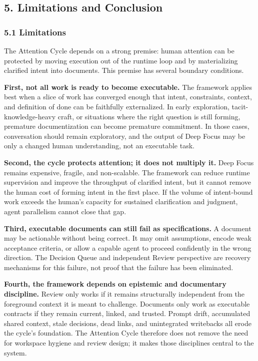 \documentclass[
  nonatbib,
  preprint]{article}
\begin{document}
\subsection{5. Limitations and
Conclusion}\label{limitations-and-conclusion}

\subsubsection{\texorpdfstring{\textbf{5.1
Limitations}}{5.1 Limitations}}\label{limitations}

The Attention Cycle depends on a strong premise: human attention can be
protected by moving execution out of the runtime loop and by
materializing clarified intent into documents. This premise has several
boundary conditions.

\textbf{First, not all work is ready to become executable.} The
framework applies best when a slice of work has converged enough that
intent, constraints, context, and definition of done can be faithfully
externalized. In early exploration, tacit-knowledge-heavy craft, or
situations where the right question is still forming, premature
documentization can become premature commitment. In those cases,
conversation should remain exploratory, and the output of Deep Focus may
be only a changed human understanding, not an executable task.

\textbf{Second, the cycle protects attention; it does not multiply it.}
Deep Focus remains expensive, fragile, and non-scalable. The framework
can reduce runtime supervision and improve the throughput of clarified
intent, but it cannot remove the human cost of forming intent in the
first place. If the volume of intent-bound work exceeds the human's
capacity for sustained clarification and judgment, agent parallelism
cannot close that gap.

\textbf{Third, executable documents can still fail as specifications.} A
document may be actionable without being correct. It may omit
assumptions, encode weak acceptance criteria, or allow a capable agent
to proceed confidently in the wrong direction. The Decision Queue and
independent Review perspective are recovery mechanisms for this failure,
not proof that the failure has been eliminated.

\textbf{Fourth, the framework depends on epistemic and documentary
discipline.} Review only works if it remains structurally independent
from the foreground context it is meant to challenge. Documents only
work as executable contracts if they remain current, linked, and
trusted. Prompt drift, accumulated shared context, stale decisions, dead
links, and unintegrated writebacks all erode the cycle's foundation. The
Attention Cycle therefore does not remove the need for workspace hygiene
and review design; it makes those disciplines central to the system.
\end{document}
